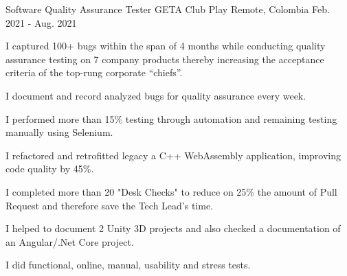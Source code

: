\begin{cventries}
  \cventry
  {Software Quality Assurance Tester} %
  {GETA Club Play} %
  {Remote, Colombia} %
  {Feb. 2021 - Aug. 2021} %
  {
    \begin{cvitems} %
      \item {I captured 100+ bugs within the span of 4 months while conducting quality assurance
                  testing on 7 company products thereby increasing the acceptance criteria of the top-rung
                  corporate “chiefs”.}
      \item {I document and record analyzed bugs for quality assurance every week.}
      \item {I performed more than 15\% testing through automation and remaining testing manually
                  using Selenium.}
      \item {I refactored and retrofitted legacy a C++ WebAssembly application, improving code
                  quality by 45\%.}
      \item {I completed more than 20 "Desk Checks" to reduce on 25\% the amount of Pull Request
                  and therefore save the Tech Lead's time.}
      \item {I helped to document 2 Unity 3D projects and also checked a documentation of an
                  Angular/.Net Core project.}
      \item {I did functional, online, manual, usability and stress tests.}
    \end{cvitems}
  }
\end{cventries}
